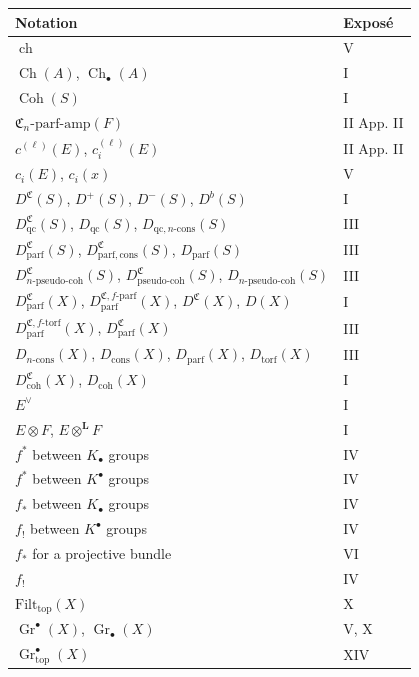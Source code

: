 \documentclass[12pt]{article}
\newcommand{\Gr}{\operatorname{Gr}}
\newcommand{\Ch}{\operatorname{Ch}}
\newcommand{\ch}{\operatorname{ch}}
\newcommand{\LL}{\mathbf L}
\newcommand{\topf}{\mathrm{top}}
\begin{document}
\begin{longtable}{p{7.5cm}l}
\toprule
\textbf{Notation} & \textbf{Exposé}\\
\midrule
\endhead
$\ch$ & V\\
$\Ch(A)$, $\Ch_\bullet(A)$ & I\\
$\operatorname{Coh}(S)$ & I\\
$\mathfrak C_n$-$\mathrm{parf\text{-}amp}(F)$ & II App. II\\
$c^{(\ell)}(E)$, $c_i^{(\ell)}(E)$ & II App. II\\
$c_i(E)$, $c_i(x)$ & V\\
$D^{\mathfrak C}(S)$, $D^{+}(S)$, $D^{-}(S)$, $D^{b}(S)$ & I\\
$D^{\mathfrak C}_{\mathrm{qc}}(S)$, $D_{\mathrm{qc}}(S)$, $D_{\mathrm{qc},n\text{-}\mathrm{cons}}(S)$ & III\\
$D^{\mathfrak C}_{\mathrm{parf}}(S)$, $D^{\mathfrak C}_{\mathrm{parf,cons}}(S)$, $D_{\mathrm{parf}}(S)$ & III\\
$D^{\mathfrak C}_{n\text{-}\mathrm{pseudo\text{-}coh}}(S)$, $D^{\mathfrak C}_{\mathrm{pseudo\text{-}coh}}(S)$, $D_{n\text{-}\mathrm{pseudo\text{-}coh}}(S)$ & III\\
$D_{\mathrm{parf}}^{\mathfrak C}(X)$, $D_{\mathrm{parf}}^{\mathfrak C,f\text{-}\mathrm{parf}}(X)$, $D^{\mathfrak C}(X)$, $D(X)$ & I\\
$D_{\mathrm{parf}}^{\mathfrak C,f\text{-}\mathrm{torf}}(X)$, $D_{\mathrm{parf}}^{\mathfrak C}(X)$ & III\\
$D_{n\text{-}\mathrm{cons}}(X)$, $D_{\mathrm{cons}}(X)$, $D_{\mathrm{parf}}(X)$, $D_{\mathrm{torf}}(X)$ & III\\
$D_{\mathrm{coh}}^{\mathfrak C}(X)$, $D_{\mathrm{coh}}(X)$ & I\\
$E^\vee$ & I\\
$E\otimes F$, $E\otimes^{\LL}F$ & I\\
$f^*$ between $K_\bullet$ groups & IV\\
$f^*$ between $K^\bullet$ groups & IV\\
$f_*$ between $K_\bullet$ groups & IV\\
$f_!$ between $K^\bullet$ groups & IV\\
$f_*$ for a projective bundle & VI\\
$f_!$ & IV\\
$\mathrm{Filt}_{\topf}(X)$ & X\\
$\Gr^\bullet(X)$, $\Gr_\bullet(X)$ & V, X\\
$\Gr^\bullet_{\topf}(X)$ & XIV\\

\end{longtable}
\end{document}
